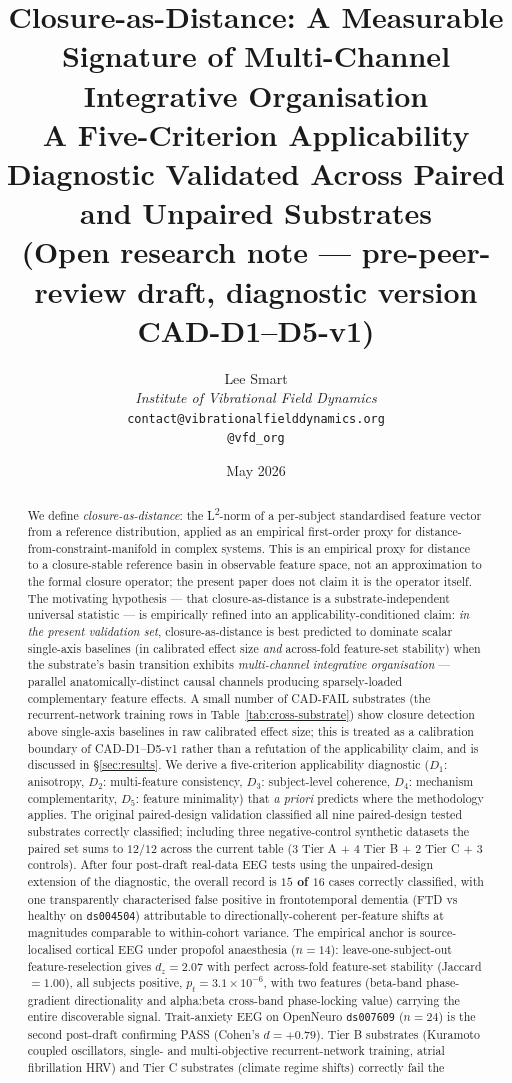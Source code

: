\documentclass[11pt,a4paper]{article}
\title{\textbf{Closure-as-Distance: A Measurable Signature of Multi-Channel Integrative Organisation}\\[2pt]
\large A Five-Criterion Applicability Diagnostic Validated Across Paired and Unpaired Substrates\\[1pt]
\small (Open research note --- pre-peer-review draft, diagnostic version CAD-D1--D5-v1)}
\author{%
  Lee Smart\\[4pt]
  \textit{Institute of Vibrational Field Dynamics}\\[2pt]
  \texttt{contact@vibrationalfielddynamics.org}\\[2pt]
  \texttt{@vfd\_org}%
}
\date{May 2026}
\begin{document}
\maketitle
\thispagestyle{empty}

\begin{abstract}
\noindent
We define \emph{closure-as-distance}: the L\textsuperscript{2}-norm of a per-subject standardised feature vector from a reference distribution, applied as an empirical first-order proxy for distance-from-constraint-manifold in complex systems. This is an empirical proxy for distance to a closure-stable reference basin in observable feature space, not an approximation to the formal closure operator; the present paper does not claim it is the operator itself. The motivating hypothesis --- that closure-as-distance is a substrate-independent universal statistic --- is empirically refined into an applicability-conditioned claim: \emph{in the present validation set}, closure-as-distance is best predicted to dominate scalar single-axis baselines (in calibrated effect size \emph{and} across-fold feature-set stability) when the substrate's basin transition exhibits \emph{multi-channel integrative organisation} --- parallel anatomically-distinct causal channels producing sparsely-loaded complementary feature effects. A small number of CAD-FAIL substrates (the recurrent-network training rows in Table~\ref{tab:cross-substrate}) show closure detection above single-axis baselines in raw calibrated effect size; this is treated as a calibration boundary of CAD-D1--D5-v1 rather than a refutation of the applicability claim, and is discussed in \S\ref{sec:results}. We derive a five-criterion applicability diagnostic ($D_1$: anisotropy, $D_2$: multi-feature consistency, $D_3$: subject-level coherence, $D_4$: mechanism complementarity, $D_5$: feature minimality) that \emph{a priori} predicts where the methodology applies. The original paired-design validation classified all nine paired-design tested substrates correctly classified; including three negative-control synthetic datasets the paired set sums to $12/12$ across the current table (3 Tier A + 4 Tier B + 2 Tier C + 3 controls). After four post-draft real-data EEG tests using the unpaired-design extension of the diagnostic, the overall record is \textbf{$15$ of $16$} cases correctly classified, with one transparently characterised false positive in frontotemporal dementia (FTD vs healthy on \texttt{ds004504}) attributable to directionally-coherent per-feature shifts at magnitudes comparable to within-cohort variance. The empirical anchor is source-localised cortical EEG under propofol anaesthesia ($n=14$): leave-one-subject-out feature-reselection gives $d_z = 2.07$ with perfect across-fold feature-set stability (Jaccard $=1.00$), all subjects positive, $p_t = 3.1 \times 10^{-6}$, with two features (beta-band phase-gradient directionality and alpha:beta cross-band phase-locking value) carrying the entire discoverable signal. Trait-anxiety EEG on OpenNeuro \texttt{ds007609} ($n=24$) is the second post-draft confirming PASS (Cohen's $d = +0.79$). Tier B substrates (Kuramoto coupled oscillators, single- and multi-objective recurrent-network training, atrial fibrillation HRV) and Tier C substrates (climate regime shifts) correctly fail the 
\end{abstract}
\end{document}

